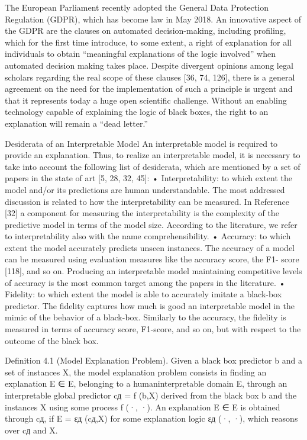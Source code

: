 The European Parliament recently adopted the General Data Protection Regulation (GDPR),
which has become law in May 2018. An innovative aspect of the GDPR are the clauses on automated decision-making, including profiling, which for the first time introduce, to some extent,
a right of explanation for all individuals to obtain “meaningful explanations of the logic involved”
when automated decision making takes place. Despite divergent opinions among legal scholars
regarding the real scope of these clauses [36, 74, 126], there is a general agreement on the need for
the implementation of such a principle is urgent and that it represents today a huge open scientific
challenge. Without an enabling technology capable of explaining the logic of black boxes, the right
to an explanation will remain a “dead letter.”

Desiderata of an Interpretable Model
An interpretable model is required to provide an explanation. Thus, to realize an interpretable
model, it is necessary to take into account the following list of desiderata, which are mentioned
by a set of papers in the state of art [5, 28, 32, 45]:
• Interpretability: to which extent the model and/or its predictions are human understandable. The most addressed discussion is related to how the interpretability can be measured.
In Reference [32] a component for measuring the interpretability is the complexity of the
predictive model in terms of the model size. According to the literature, we refer to interpretability also with the name comprehensibility.
• Accuracy: to which extent the model accurately predicts unseen instances. The accuracy
of a model can be measured using evaluation measures like the accuracy score, the F1-
score [118], and so on. Producing an interpretable model maintaining competitive levels of
accuracy is the most common target among the papers in the literature.
• Fidelity: to which extent the model is able to accurately imitate a black-box predictor. The
fidelity captures how much is good an interpretable model in the mimic of the behavior of
a black-box. Similarly to the accuracy, the fidelity is measured in terms of accuracy score,
F1-score, and so on, but with respect to the outcome of the black box.

Definition 4.1 (Model Explanation Problem). Given a black box predictor b and a set of instances
X, the model explanation problem consists in finding an explanation E ∈ E, belonging to a humaninterpretable domain E, through an interpretable global predictor cд = f (b,X) derived from the
black box b and the instances X using some process f (·, ·). An explanation E ∈ E is obtained
through cд, if E = εд (cд,X) for some explanation logic εд (·, ·), which reasons over cд and X.

